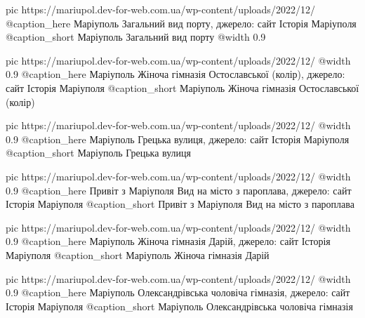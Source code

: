   pic https://mariupol.dev-for-web.com.ua/wp-content/uploads/2022/12/%
  @caption_here Маріуполь Загальний вид порту, джерело: сайт Історія Маріуполя
  @caption_short Маріуполь Загальний вид порту
  @width 0.9

  pic https://mariupol.dev-for-web.com.ua/wp-content/uploads/2022/12/%
  @width 0.9
  @caption_here Маріуполь Жіноча гімназія Остославської (колір), джерело: сайт Історія Маріуполя
  @caption_short Маріуполь Жіноча гімназія Остославської (колір)

  pic https://mariupol.dev-for-web.com.ua/wp-content/uploads/2022/12/%
  @width 0.9
  @caption_here Маріуполь Грецька вулиця, джерело: сайт Історія Маріуполя
  @caption_short Маріуполь Грецька вулиця

  pic https://mariupol.dev-for-web.com.ua/wp-content/uploads/2022/12/%
  @width 0.9
  @caption_here Привіт з Маріуполя Вид на місто з пароплава, джерело: сайт Історія Маріуполя
  @caption_short Привіт з Маріуполя Вид на місто з пароплава

  pic https://mariupol.dev-for-web.com.ua/wp-content/uploads/2022/12/%
  @width 0.9
  @caption_here Маріуполь Жіноча гімназія Дарій, джерело: сайт Історія Маріуполя
  @caption_short Маріуполь Жіноча гімназія Дарій

  pic https://mariupol.dev-for-web.com.ua/wp-content/uploads/2022/12/%
  @width 0.9
  @caption_here Маріуполь Олександрівська чоловіча гімназія, джерело: сайт Історія Маріуполя
  @caption_short Маріуполь Олександрівська чоловіча гімназія

